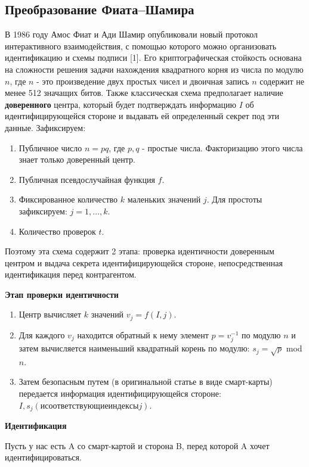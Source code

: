 \documentclass[colorthm]{./civarticle}
\begin{document}
\subsection{Преобразование Фиата–Шамира}

В 1986 году Амос Фиат и Ади Шамир опубликовали новый протокол интерактивного взаимодействия, с помощью которого можно организовать идентификацию и  схемы подписи [1]. Его криптографическая стойкость основана на сложности решения задачи нахождения квадратного корня из числа по модулю $n$, где $n$ - это произведение двух простых чисел и двоичная запись $n$ содержит не менее 512 значащих битов. Также классическая схема предполагает наличие \textbf{доверенного} центра, который будет подтверждать информацию $I$ об идентифицирующейся стороне и выдавать ей определенный секрет под эти данные. 
Зафиксируем:

\begin{enumerate}
    \item Публичное число $n=pq$, где $p,q$ - простые числа. Факторизацию этого числа знает только доверенный центр.
    \item Публичная псевдослучайная функция $f$.
    \item Фиксированное количество $k$ маленьких значений $j$. Для простоты зафиксируем: $j = 1, \ldots, k$.
    \item Количество проверок $t$.
\end{enumerate}

Поэтому эта схема содержит 2 этапа: проверка идентичности доверенным центром и выдача секрета идентифицирующейся стороне, непосредственная идентификация перед контрагентом.

\textbf{Этап проверки идентичности}

\begin{enumerate}
    \item Центр вычисляет $k$ значений $v_j = f(I, j)$.
    \item Для каждого $v_j$ находится обратный к нему элемент $p = v^{-1}_j$ по модулю $n$ и затем вычисляется наименьший квадратный корень по модулю: $s_j = \sqrt{p}$ mod $n$.
    \item Затем безопасным путем (в оригинальной статье в виде смарт-карты) передается информация идентифицирующейся стороне: $I, s_j (и соответствующие индексы j)$. 
\end{enumerate}

\textbf{Идентификация}

Пусть у нас есть A со смарт-картой и сторона B, перед которой A хочет идентифицироваться.
\end{document}
